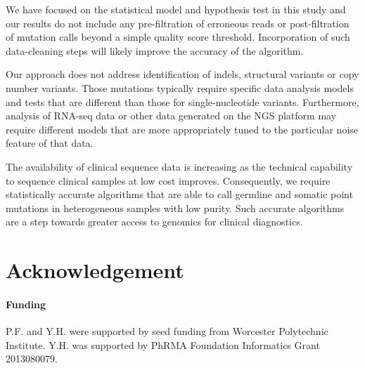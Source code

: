 \documentclass{bioinfo}
\begin{document}
We have focused on the statistical model and hypothesis test in this study and our results do not include any pre-filtration of erroneous reads or post-filtration of mutation calls beyond a simple quality score threshold. Incorporation of such data-cleaning steps will likely improve the accuracy of the algorithm.

Our approach does not address identification of indels, structural variants or copy number variants. Those mutations typically require specific data analysis models and tests that are different than those for single-nucleotide variants. Furthermore, analysis of RNA-seq data or other data generated on the NGS platform may require different models that are more appropriately tuned to the particular noise feature of that data.

The availability of clinical sequence data is increasing as the technical capability to sequence clinical samples at low cost improves. Consequently, we require statistically accurate algorithms that are able to call germline and somatic point mutations in heterogeneous samples with low purity. Such accurate algorithms are a step towards greater access to genomics for clinical diagnostics.
\vspace{-5pt}
\section*{Acknowledgement}
\paragraph{Funding\textcolon}  P.F. and Y.H. were supported by seed funding from Worcester Polytechnic Institute. Y.H. was supported by PhRMA Foundation Informatics Grant 2013080079.



\end{document}

